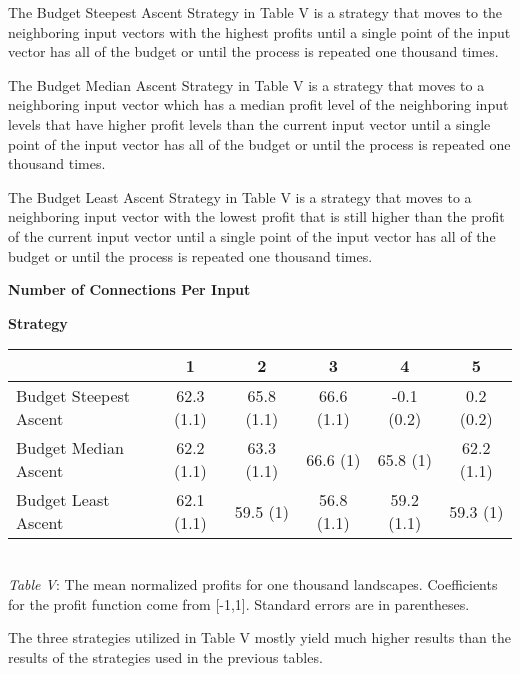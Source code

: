 The Budget Steepest Ascent Strategy in Table V is a strategy that moves
to the neighboring input vectors with the highest profits until a single
point of the input vector has all of the budget or until the process is
repeated one thousand times.

The Budget Median Ascent Strategy in Table V is a strategy that moves to
a neighboring input vector which has a median profit level of the
neighboring input levels that have higher profit levels than the current
input vector until a single point of the input vector has all of the
budget or until the process is repeated one thousand times.

The Budget Least Ascent Strategy in Table V is a strategy that moves to
a neighboring input vector with the lowest profit that is still higher
than the profit of the current input vector until a single point of the
input vector has all of the budget or until the process is repeated one
thousand times.

\begin{center}
\hspace{2cm} \textbf{Number of Connections Per Input}
\begin{flushleft}
\hspace{2.5cm} \textbf{Strategy}
\end{flushleft}
\begin{Schunk}

\begin{tabular}{l|c|c|c|c|c}
\hline
  & 1 & 2 & 3 & 4 & 5\\
\hline
Budget Steepest Ascent & 62.3 (1.1) & 65.8 (1.1) & 66.6 (1.1) & -0.1 (0.2) & 0.2 (0.2)\\
\hline
Budget Median Ascent & 62.2 (1.1) & 63.3 (1.1) & 66.6 (1) & 65.8 (1) & 62.2 (1.1)\\
\hline
Budget Least Ascent & 62.1 (1.1) & 59.5 (1) & 56.8 (1.1) & 59.2 (1.1) & 59.3 (1)\\
\hline
\end{tabular}

\end{Schunk}
\\
\emph{Table V}: The mean normalized profits for one thousand landscapes. Coefficients for the profit function come from [-1,1]. Standard errors are in parentheses.
\end{center}

The three strategies utilized in Table V mostly yield much higher
results than the results of the strategies used in the previous tables.

